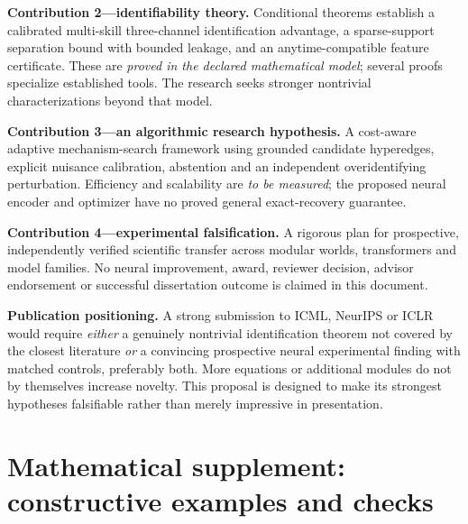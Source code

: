 \documentclass[11pt,a4paper]{article}
\theoremstyle{definition}\newtheorem{definition}[theorem]{Definition}
\theoremstyle{remark}\newtheorem{remark}[theorem]{Remark}
\begin{document}
\textbf{Contribution 2---identifiability theory.} Conditional theorems establish a calibrated multi-skill three-channel identification advantage, a sparse-support separation bound with bounded leakage, and an anytime-compatible feature certificate. These are \emph{proved in the declared mathematical model}; several proofs specialize established tools. The research seeks stronger nontrivial characterizations beyond that model.

\textbf{Contribution 3---an algorithmic research hypothesis.} A cost-aware adaptive mechanism-search framework using grounded candidate hyperedges, explicit nuisance calibration, abstention and an independent overidentifying perturbation. Efficiency and scalability are \emph{to be measured}; the proposed neural encoder and optimizer have no proved general exact-recovery guarantee.

\textbf{Contribution 4---experimental falsification.} A rigorous plan for prospective, independently verified scientific transfer across modular worlds, transformers and model families. No neural improvement, award, reviewer decision, advisor endorsement or successful dissertation outcome is claimed in this document.

\textbf{Publication positioning.} A strong submission to ICML, NeurIPS or ICLR would require \emph{either} a genuinely nontrivial identification theorem not covered by the closest literature \emph{or} a convincing prospective neural experimental finding with matched controls, preferably both. More equations or additional modules do not by themselves increase novelty. This proposal is designed to make its strongest hypotheses falsifiable rather than merely impressive in presentation.

\clearpage
\appendix
\section{Mathematical supplement: constructive examples and checks}\label{app:math}
\end{document}
